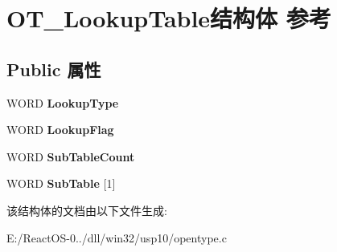 \hypertarget{struct_o_t___lookup_table}{}\section{O\+T\+\_\+\+Lookup\+Table结构体 参考}
\label{struct_o_t___lookup_table}
\subsection*{Public 属性}
\begin{DoxyCompactItemize}
\item 
\mbox{\label{struct_o_t___lookup_table_afc7507d6bb7723d49bbdf304b484ecac}} 
W\+O\+RD {\bfseries Lookup\+Type}
\item 
\mbox{\label{struct_o_t___lookup_table_aefa725bda11ce31dc2dd375668b20793}} 
W\+O\+RD {\bfseries Lookup\+Flag}
\item 
\mbox{\label{struct_o_t___lookup_table_ae27707e48994fcf55afce41be6922d72}} 
W\+O\+RD {\bfseries Sub\+Table\+Count}
\item 
\mbox{\label{struct_o_t___lookup_table_a21aca52578e217db5e696f661b7d806d}} 
W\+O\+RD {\bfseries Sub\+Table} \mbox{[}1\mbox{]}
\end{DoxyCompactItemize}


该结构体的文档由以下文件生成\+:\begin{DoxyCompactItemize}
\item 
E\+:/\+React\+O\+S-\/0../dll/win32/usp10/opentype.\+c\end{DoxyCompactItemize}
